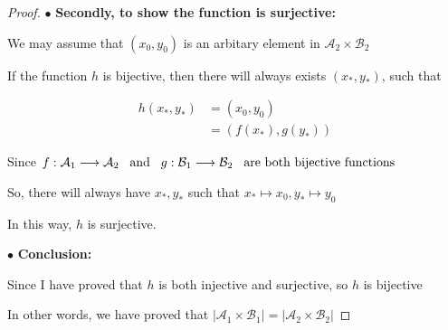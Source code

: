 \documentclass[12pt]{article}
\begin{document}
\begin{proof}
\vspace*{0.3cm}
\hspace*{1.2cm}
$\bullet$ \textbf{Secondly, to show the function is surjective:}

\vspace*{0.3cm}
\hspace*{1.2cm}
We may assume that $(x_0,y_0)$ is an arbitary element in $ \mathcal{A}_2
\times \mathcal{B}_2 $

\vspace*{0.3cm}
\hspace*{1.2cm}
If the function $h$ is bijective, then there will always exists $(x_*,y_*)$, such that

\begin{align*}
    h(x_*,y_*) &= (x_0,y_0) \\
    &= (f(x_*),g(y_*))
\end{align*}


\vspace*{0.3cm}
\hspace*{1.2cm}
Since $ f: \mathcal{A}_1 \longrightarrow \mathcal{A}_2 \hspace*{0.3cm}\text{and}
\hspace*{0.3cm} g: \mathcal{B}_1 \longrightarrow \mathcal{B}_2 \hspace{0,3cm}\text{are both
bijective functions} $

\vspace*{0.3cm}
\hspace*{1.2cm}
So, there will always have $x_*, y_*$ such that $x_* \mapsto x_0 , y_* \mapsto y_0 $

\vspace*{0.3cm}
\hspace*{1.2cm}
In this way, $h$ is surjective.

\vspace*{0.3cm}
\hspace*{1.2cm}
$\bullet$ \textbf{Conclusion:}

\vspace*{0.3cm}
\hspace*{1.2cm}
Since I have proved that $h$ is both injective and surjective, so $h$ is bijective

\vspace*{0.3cm}
\hspace*{1.2cm}
In other words, we have proved that $ \vert \mathcal{A}_1 \times \mathcal{B}_1 \vert
= \vert \mathcal{A}_2 \times \mathcal{B}_2 \vert $


\end{proof}
\end{document}
